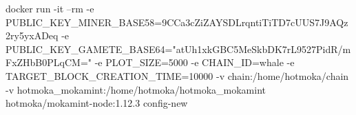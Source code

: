 \begin{shellcommandbox}\begin{ttlst}
docker run -it --rm -e PUBLIC_KEY_MINER_BASE58=9CCa3cZiZAYSDLrqntiTiTD7cUUS7J9AQz2ry5yxADeq -e PUBLIC_KEY_GAMETE_BASE64="atUh1xkGBC5MeSkbDK7rL9527PidR/mFxZHbB0PLqCM=" -e PLOT_SIZE=5000 -e CHAIN_ID=whale -e TARGET_BLOCK_CREATION_TIME=10000 -v chain:/home/hotmoka/chain -v hotmoka_mokamint:/home/hotmoka/hotmoka_mokamint hotmoka/mokamint-node:1.12.3 config-new
\end{ttlst}\end{shellcommandbox}
